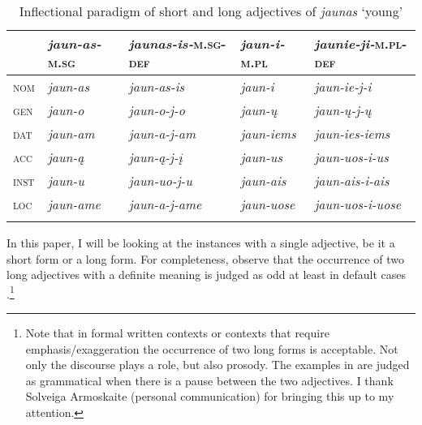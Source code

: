 \documentclass[output=paper,
modfonts
]{langscibook}
\begin{document}
\begin{table} 
	\begin{tabularx}{\textwidth}{p{0.8cm} p{2cm} p{3cm} p{1.9cm} p{2.85cm}}
		\lsptoprule
		{ } & \textit{jaun-as-}\textsc{m.sg} & \textit{jaunas-is-}\textsc{m.sg-def} & \textit{jaun-i-}\textsc{m.pl} & \textit{jaunie-ji-}\textsc{m.pl-def} \\
		\midrule
		\textsc{nom} & \textit{jaun-as}  & \textit{jaun-as-is} & \textit{jaun-i}  & \textit{jaun-ie-j-i} \\ 
		\textsc{gen} & \textit{jaun-o}  & \textit{jaun-o-j-o} & \textit{jaun-ų}  & \textit{jaun-ų-j-ų} \\ 
		\textsc{dat} & \textit{jaun-am} & \textit{jaun-a-j-am} & \textit{jaun-iems}  & \textit{jaun-ies-iems} \\ 
		\textsc{acc} & \textit{jaun-ą} & \textit{jaun-ą-j-į} & \textit{jaun-us} & \textit{jaun-uos-i-us} \\ 
		\textsc{inst} & \textit{jaun-u}  & \textit{jaun-uo-j-u} & \textit{jaun-ais}  & \textit{jaun-ais-i-ais} \\ 
		\textsc{loc} & \textit{jaun-ame} & \textit{jaun-a-j-ame} & \textit{jaun-uose}  & \textit{jaun-uos-i-uose} \\
		\lspbottomrule
	\end{tabularx}
	\caption{Inflectional paradigm of short and long adjectives of \textit{jaunas} `young' \citep[adapted from][]{Stolz2008}}
	\label{tab:sereikaite:1}
\end{table}

In this paper, I will be looking at the instances with a single adjective, be it a short form or a long form. For completeness, observe that the occurrence of two long adjectives with a definite meaning is judged as odd at least in default cases .\footnote{Note that in formal written contexts or contexts that require emphasis/exaggeration the occurrence of two long forms is acceptable. Not only the discourse plays a role, but also prosody. The examples in  are judged as grammatical when there is a pause between the two adjectives. I thank Solveiga Armoskaite (personal communication) for bringing this up to my attention.}

\begin{exe}
	\ex \label{ex:sereikaite:9}
	\begin{xlist}
	\end{xlist}
\end{exe}
\end{document}

